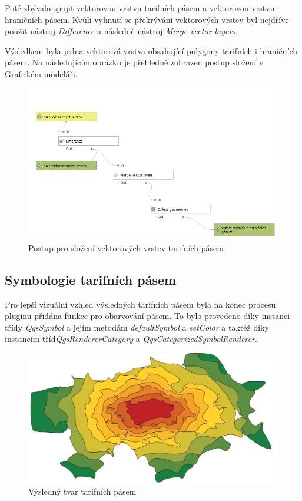 Poté zbývalo spojit vektorovou vrstvu tarifních pásem a vektorovou vrstvu hra\-ničních pásem. Kvůli vyhnutí se 
překrývání vektorových vrstev byl nejdříve použit nástroj \textit{Difference} a následně nástroj  \textit{Merge vector layers}.

Výsledkem byla jedna vektorová vrstva obsahující polygony tarifních i hraničních pásem. Na následujícím obrázku
je přehledně zobrazen postup složení v Grafickém modeláři.

\begin{figure}[H] \centering
    \includegraphics[width=350pt]{./pictures/postup-collecting.png}
    \caption[Postup pro složení vektorových vrstev tarifních pásem]{Postup pro složení vektorových vrstev tarifních pásem}
	\label{fig:postup-collecting}              
\end{figure}

\subsection{Symbologie tarifních pásem}
\label{symbologie}

Pro lepší vizuální vzhled výsledných tarifních pásem byla na konec procesu pluginu přidána funkce
pro obarvování pásem. To bylo provedeno díky instanci třídy \textit{QgsSymbol} a jejím metodám 
\textit{defaultSymbol} a \textit{setColor} a taktéž díky instancím tříd\textit{QgsRendererCategory}
a \textit{QgsCategorizedSymbolRenderer}.

\begin{figure}[H] \centering
    \includegraphics[width=400pt]{./pictures/vysledek2.png}
    \caption[Výsledný tvar tarifních pásem]{Výsledný tvar tarifních pásem}
	\label{fig:vysledek}              
\end{figure}

